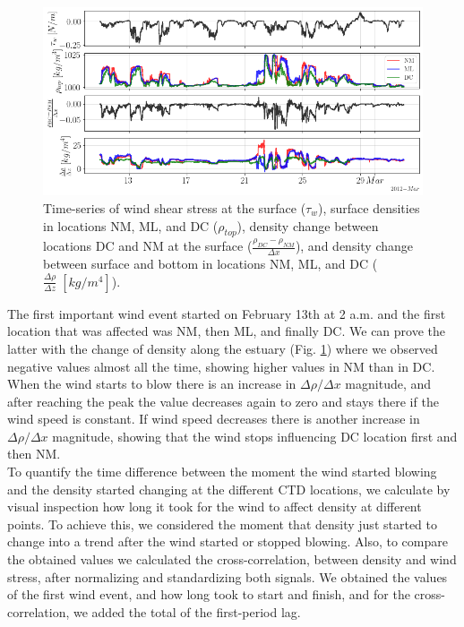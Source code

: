 \documentclass[tesis.tex]{subfiles}
\begin{document}
\begin{figure}[h!]
    \centering
    \includegraphics[width=\textwidth]{Imagenes/diff.png}
    \caption{Time-series of wind shear stress at the surface ($\tau_w$), surface densities in locations NM, ML, and DC ($\rho_{top}$), density change between locations DC and NM at the surface ($\frac{\rho_{DC}-\rho_{NM}}{\Delta x}$), and density change between surface and bottom in locations NM, ML, and DC ($\frac{\Delta \rho}{\Delta z} \; [kg/m^4]$).}
    \label{fig:diff}
\end{figure}

The first important wind event started on February 13th at 2 a.m. and the first location that was affected was NM, then ML, and finally DC. We can prove the latter with the change of density along the estuary (Fig. \ref{fig:diff}) where we observed negative values almost all the time, showing higher values in NM than in DC. When the wind starts to blow there is an increase in $\Delta \rho/\Delta x$ magnitude, and after reaching the peak the value decreases again to zero and stays there if the wind speed is constant. If wind speed decreases there is another increase in $\Delta \rho/\Delta x$ magnitude, showing that the wind stops influencing DC location first and then NM.\\

To quantify the time difference between the moment the wind started blowing and the density started changing at the different CTD locations, we calculate by visual inspection how long it took for the wind to affect density at different points. To achieve this, we considered the moment that density just started to change into a trend after the wind started or stopped blowing. Also, to compare the obtained values we calculated the cross-correlation, between density and wind stress, after normalizing and standardizing both signals. We obtained the values of the first wind event, and how long took to start and finish, and for the cross-correlation, we added the total of the first-period lag.\\
\end{document}
